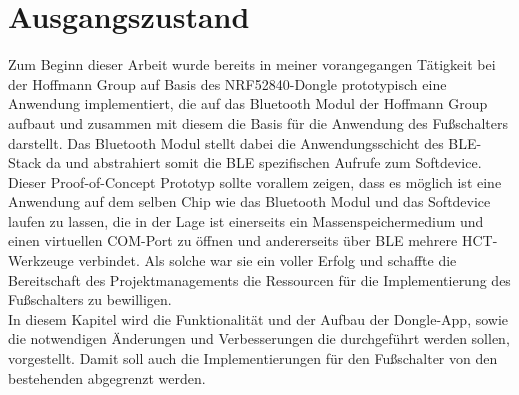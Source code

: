\section{Ausgangszustand}
\label{Ausgangszustand}
Zum Beginn dieser Arbeit wurde bereits in meiner vorangegangen Tätigkeit bei der Hoffmann Group auf Basis des NRF52840-Dongle prototypisch eine Anwendung implementiert, die auf das Bluetooth Modul der Hoffmann Group aufbaut und zusammen mit diesem die Basis für die Anwendung des Fußschalters darstellt. Das Bluetooth Modul stellt dabei die Anwendungsschicht des \ac{BLE}-Stack da und abstrahiert somit die \ac{BLE} spezifischen Aufrufe zum Softdevice. Dieser Proof-of-Concept Prototyp sollte vorallem zeigen, dass es möglich ist eine Anwendung auf dem selben Chip wie das Bluetooth Modul und das Softdevice laufen zu lassen, die in der Lage ist einerseits ein Massenspeichermedium und einen virtuellen COM-Port zu öffnen und andererseits über \ac{BLE} mehrere \ac{HCT}-Werkzeuge verbindet. Als solche war sie ein voller Erfolg und schaffte die Bereitschaft des Projektmanagements die Ressourcen für die Implementierung des Fußschalters zu bewilligen.\\
In diesem Kapitel wird die Funktionalität und der Aufbau der Dongle-App, sowie die notwendigen Änderungen und Verbesserungen die durchgeführt werden sollen, vorgestellt. Damit soll auch die Implementierungen für den Fußschalter von den bestehenden abgegrenzt werden.

